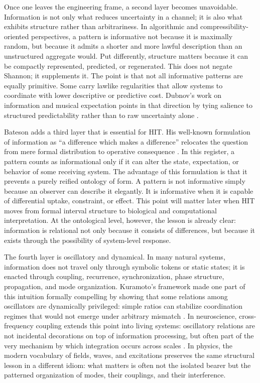 Once one leaves the engineering frame, a second layer becomes unavoidable. Information is not only what reduces uncertainty in a channel; it is also what exhibits structure rather than arbitrariness. In algorithmic and compressibility-oriented perspectives, a pattern is informative not because it is maximally random, but because it admits a shorter and more lawful description than an unstructured aggregate would. Put differently, structure matters because it can be compactly represented, predicted, or regenerated. This does not negate Shannon; it supplements it. The point is that not all informative patterns are equally primitive. Some carry lawlike regularities that allow systems to coordinate with lower descriptive or predictive cost. Dubnov's work on information and musical expectation points in that direction by tying salience to structured predictability rather than to raw uncertainty alone \parencite{dubnov_2004}.

Bateson adds a third layer that is essential for HIT. His well-known formulation of information as \enquote{a difference which makes a difference} relocates the question from mere formal distribution to operative consequence \parencite{bateson_1972}. In this register, a pattern counts as informational only if it can alter the state, expectation, or behavior of some receiving system. The advantage of this formulation is that it prevents a purely reified ontology of form. A pattern is not informative simply because an observer can describe it elegantly. It is informative when it is capable of differential uptake, constraint, or effect. This point will matter later when HIT moves from formal interval structure to biological and computational interpretation. At the ontological level, however, the lesson is already clear: information is relational not only because it consists of differences, but because it exists through the possibility of system-level response.

The fourth layer is oscillatory and dynamical. In many natural systems, information does not travel only through symbolic tokens or static states; it is enacted through coupling, recurrence, synchronization, phase structure, propagation, and mode organization. Kuramoto's framework made one part of this intuition formally compelling by showing that some relations among oscillators are dynamically privileged: simple ratios can stabilize coordination regimes that would not emerge under arbitrary mismatch \parencite{kuramoto_1984,strogatz_2000}. In neuroscience, cross-frequency coupling extends this point into living systems: oscillatory relations are not incidental decorations on top of information processing, but often part of the very mechanism by which integration occurs across scales \parencite{canolty_2010}. In physics, the modern vocabulary of fields, waves, and excitations preserves the same structural lesson in a different idiom: what matters is often not the isolated bearer but the patterned organization of modes, their couplings, and their interference.

